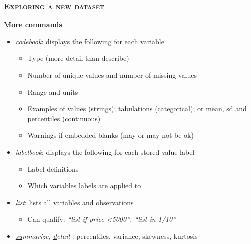 \documentclass[10pt]{beamer}
\begin{document}
	\begin{frame}
		\frametitle{\textsc{Exploring a new dataset}}
		\begin{center}
			\Large\textbf{More commands}
		\end{center}
		\begin{itemize}
			\item 	\textit{codebook}: displays the following for each variable
		
			\begin{itemize}
				\item Type (more detail than describe)
				\item Number of unique values and number of missing values
				\item Range and units
				\item Examples of values (strings); tabulations (categorical); or mean, sd and percentiles (continuous)
				\item Warnings if embedded blanks (may or may not be ok)
			\end{itemize}
			\item \textit{labelbook}: displays the following for each stored value label
			\begin{itemize}
				\item Label definitions
				\item Which variables labels are applied to
			\end{itemize}
			\item \textit{\underline{l}ist}: lists all variables and observations
			\begin{itemize}
				\item Can qualify: \textit{“list if price \textless 5000”, “list in 1/10”}
			\end{itemize}
			\item \textit{\underline{su}mmarize, \underline{d}etail} : percentiles, variance, skewness, kurtosis
			
		\end{itemize}
	\end{frame}
\end{document}
